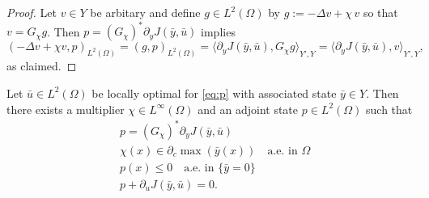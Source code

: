 \documentclass[reqno]{shinyart}
\begin{document}
\begin{proof}
    Let $v\in Y$ be arbitary and define $g\in L^2(\Omega)$ by $g := -\Delta v + \chi\, v$ so that $v = G_\chi g$.
    Then $p = (G_\chi)^* \partial_yJ(\bar{y}, \bar{u})$ implies
    \begin{equation*}
        (-\Delta v + \chi v , p)_{L^2(\Omega)}
        = (g,p)_{L^2(\Omega)} = {\langle {\partial_y J(\bar{y}, \bar{u})} , {G_\chi g} \rangle}_{Y',Y} 
        = {\langle {\partial_y J(\bar{y}, \bar{u})} , {v} \rangle}_{Y', Y},
    \end{equation*}
    as claimed.
\end{proof}

\begin{theorem}\label{thm:strongstat}
    Let $\bar{u} \in L^2(\Omega)$ be locally optimal for \eqref{eq:p} with associated state 
    $\bar{y} \in Y$. Then there exists a multiplier $\chi \in L^\infty(\Omega)$ 
    and an adjoint state $p\in L^2(\Omega)$ such that 
    \begin{subequations}\label{eq:SKKT}
        \begin{align}
            &p = (G_\chi)^* \partial_y J(\bar{y}, \bar{u}) \label{eq:SKKTad}\\
            &\chi(x) \in \partial_c \max(\bar y(x)) \quad \text{a.e.\ in }\Omega \label{eq:SKKTsubdiff}\\
            &p(x) \leq 0 \quad\text{a.e.\ in } \{\bar y=0\} \label{eq:SKKTpsign}\\
            &p + \partial_u J(\bar{y}, \bar{u}) = 0. \label{eq:SKKTgradeq}
        \end{align} 
    \end{subequations}
\end{theorem}
\end{document}
